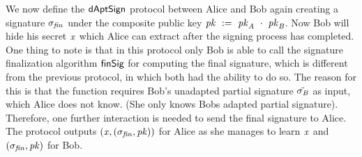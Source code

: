 We now define the $\mathsf{dAptSign}$ protocol between Alice and Bob again creating a signature $\sigma_{\mathit{fin}}$ under the composite public key $\mathit{pk} ~:=~ \mathit{pk}_{\mathit{A}} ~\cdot~ \mathit{pk}_{\mathit{B}}$.
Now Bob will hide his secret $\mathit{x}$ which Alice can extract after the signing process has completed.
One thing to note is that in this protocol only Bob is able to call the signature finalization algorithm $\mathsf{finSig}$ for computing the final signature, which is different from the previous protocol, in which both had the ability to do so.
The reason for this is that the function requires Bob's unadapted partial signature $\tilde{\sigma_{\mathit{B}}}$ as input, which Alice does not know. (She only knows Bobs adapted partial signature).
Therefore, one further interaction is needed to send the final signature to Alice.
The protocol outputs $(\mathit{x}, (\sigma_{\mathit{fin}}, \mathit{pk}))$ for Alice as she manages to learn $\mathit{x}$ and $(\sigma_{\mathit{fin}}, \mathit{pk})$ for Bob.

